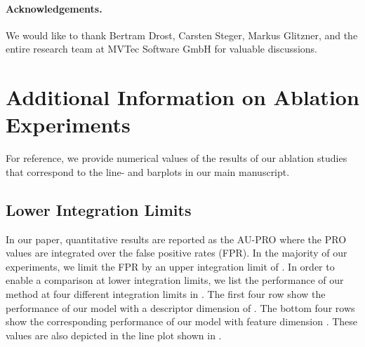\documentclass[twoside,11pt]{article}
\begin{document}
\paragraph{Acknowledgements.} We would like to thank Bertram Drost, Carsten Steger, Markus Glitzner, and the entire research team at MVTec Software GmbH for valuable discussions.


\vskip 0.2in



\appendix

\clearpage

\section{Additional Information on Ablation Experiments}
\label{appendix:ablation}

For reference, we provide numerical values of the results of our ablation studies that correspond to the line- and barplots in our main manuscript.

\subsection{Lower Integration Limits}

In our paper, quantitative results are reported as the AU-PRO where the PRO values are integrated over the false positive rates (FPR). In the majority of our experiments, we limit the FPR by an upper integration limit of . In order to enable a comparison at lower integration limits, we list the performance of our method at four different integration limits  in . The first four row show the performance of our model with a descriptor dimension of . The bottom four rows show the corresponding performance of our model with feature dimension . These values are also depicted in the line plot shown in .
\end{document}
